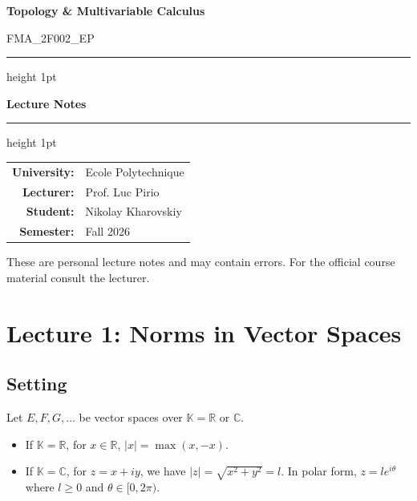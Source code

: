 \documentclass[11pt, a4paper]{article}
\newcommand{\CourseName}{Topology \& Multivariable Calculus}
\newcommand{\CourseCode}{FMA\_2F002\_EP}
\newcommand{\University}{Ecole Polytechnique}
\newcommand{\Lecturer}{Prof. Luc Pirio}
\newcommand{\StudentName}{Nikolay Kharovskiy}
\newcommand{\Semester}{Fall 2026}
\begin{document}
\begin{titlepage}
  \centering
  \vspace*{2cm}

  {\Huge\bfseries \CourseName \par}
  \vspace{0.5cm}
  {\large \CourseCode \par}

  \vspace{1.5cm}
  \hrule height 1pt
  \vspace{0.4cm}
  {\Large\bfseries Lecture Notes \par}
  \vspace{0.4cm}
  \hrule height 1pt

  \vspace{2cm}

  \begin{tabular}{rl}
    \textbf{University:} & \University \\[4pt]
    \textbf{Lecturer:}   & \Lecturer   \\[4pt]
    \textbf{Student:}    & \StudentName \\[4pt]
    \textbf{Semester:}   & \Semester   \\[4pt]
  \end{tabular}

  \vfill

  {\small These are personal lecture notes and may contain errors.
         For the official course material consult the lecturer.}
\end{titlepage}

\tableofcontents
\newpage

\section{Lecture 1: Norms in Vector Spaces}
\subsection{Setting}
Let $E, F, G, \dots$ be vector spaces over $\mathbb{K} = \mathbb{R}$ or $\mathbb{C}$.
\begin{itemize}
    \item If $\mathbb{K} = \mathbb{R}$, for $x \in \mathbb{R}$, $|x| = \max(x, -x)$.
    \item If $\mathbb{K} = \mathbb{C}$, for $z = x + iy$, we have $|z| = \sqrt{x^2 + y^2} = l$. In polar form, $z = l e^{i\theta}$ where $l \ge 0$ and $\theta \in [0, 2\pi)$.
\end{itemize}
\end{document}
